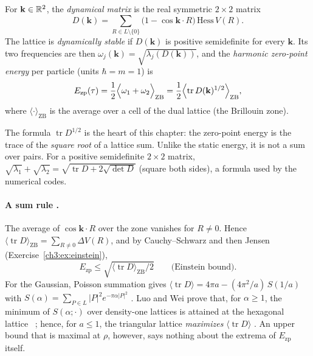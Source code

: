 \begin{definition}\label{ch3:def:ezp}
For $\mathbf k\in\mathbb{R}^2$, the \emph{dynamical matrix} is the real symmetric $2\times2$ matrix
\[
D(\mathbf k)=\sum_{R\in L\setminus\{0\}}\bigl(1-\cos\mathbf k\cdot R\bigr)\,\mathrm{Hess}\,V(R).
\]
The lattice is \emph{dynamically stable} if $D(\mathbf k)$ is positive semidefinite for every $\mathbf k$. Its two
frequencies are then $\omega_j(\mathbf k)=\sqrt{\lambda_j(D(\mathbf k))}$, and the \emph{harmonic zero-point energy} per
particle (units $\hbar=m=1$) is
\[
E_{\mathrm{zp}}(\tau)=\frac12\Bigl\langle\omega_1+\omega_2\Bigr\rangle_{\mathrm{ZB}}=\frac12\Bigl\langle
\operatorname{tr}D(\mathbf k)^{1/2}\Bigr\rangle_{\mathrm{ZB}},
\]
where $\langle\cdot\rangle_{\mathrm{ZB}}$ is the average over a cell of the dual lattice (the Brillouin zone). \tierC
\end{definition}
\noindent The formula $\operatorname{tr}D^{1/2}$ is the heart of this chapter: the zero-point energy is the trace of the
\emph{square root} of a lattice sum. Unlike the static energy, it is not a sum over pairs.
For a positive semidefinite $2\times2$ matrix, $\sqrt{\lambda_1}+\sqrt{\lambda_2}=\sqrt{\operatorname{tr}D+2\sqrt{\det D}}$
(square both sides), a formula used by the numerical codes.

\paragraph{A sum rule \tierC.} The average of $\cos\mathbf k\cdot R$ over the zone vanishes for $R\neq0$. Hence
$\langle\operatorname{tr}D\rangle_{\mathrm{ZB}}=\sum_{R\ne0}\Delta V(R)$, and by Cauchy--Schwarz and then Jensen
(Exercise~\ref{ch3:ex:einstein}),
\begin{equation}\label{ch3:eq:einstein}
E_{\mathrm{zp}}\le\sqrt{\langle\operatorname{tr}D\rangle_{\mathrm{ZB}}/2}\qquad\text{(Einstein bound).}
\end{equation}
For the Gaussian, Poisson summation gives
$\langle\operatorname{tr}D\rangle=4\pi a-(4\pi^2/a)\,S(1/a)$ with $S(\alpha)=\sum_{P\in L}|P|^2e^{-\pi\alpha|P|^2}$ \tierC.
Luo and Wei prove that, for $\alpha\ge1$, the minimum of $S(\alpha;\cdot)$ over density-one lattices is attained
at the hexagonal lattice~\cite{ch3-luowei} \tierL; hence, for $a\le1$, the triangular lattice \emph{maximizes}
$\langle\operatorname{tr}D\rangle$ \tierC. An upper bound that is maximal at $\rho$, however, says nothing about the
extrema of $E_{\mathrm{zp}}$ itself.

